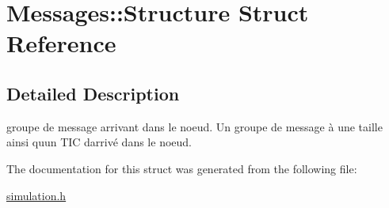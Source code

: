 \hypertarget{structMessages_1_1Structure}{}\section{Messages\+:\+:Structure Struct Reference}
\label{structMessages_1_1Structure}


\subsection{Detailed Description}
groupe de message arrivant dans le noeud. Un groupe de message à une taille ainsi qu\textquotesingle{}un T\+IC d\textquotesingle{}arrivé dans le noeud. 

The documentation for this struct was generated from the following file\+:\begin{DoxyCompactItemize}
\item 
\hyperlink{simulation_8h}{simulation.\+h}\end{DoxyCompactItemize}
